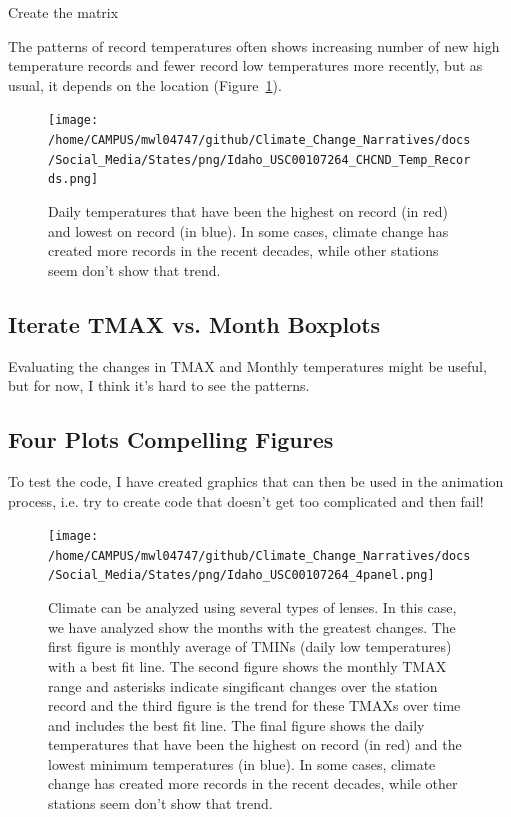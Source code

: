\documentclass{article}\usepackage[]{graphicx}\usepackage[]{color}
\makeatletter
\newenvironment{kframe}{%
 \def\at@end@of@kframe{}%
 \ifinner\ifhmode%
  \def\at@end@of@kframe{\end{minipage}}%
  \begin{minipage}{\columnwidth}%
 \fi\fi%
 \def\FrameCommand##1{\hskip\@totalleftmargin \hskip-\fboxsep
 \colorbox{shadecolor}{##1}\hskip-\fboxsep
     \hskip-\linewidth \hskip-\@totalleftmargin \hskip\columnwidth}%
 \MakeFramed {\advance\hsize-\width
   \@totalleftmargin\z@ \linewidth\hsize
   \@setminipage}}%
 {\par\unskip\endMakeFramed%
 \at@end@of@kframe}
\newenvironment{knitrout}{}{} %
\makeatother
\begin{document}
Create the matrix
\begin{knitrout}
\color{fgcolor}\begin{kframe}


{\ttfamily\noindent\bfseries\color{errorcolor}{\#\# Error in TMAX.mat.noleap[j, year.seq\$Col[year.seq\$Year == i]] <- CHCND.noleap\$TMAX[CHCND.noleap\$Year == : replacement has length zero}}\end{kframe}
\end{knitrout}




The patterns of record temperatures often shows increasing number of new high temperature records  and fewer record low temperatures more recently, but as usual, it depends on the location (Figure~\ref{fig:Records}).
\begin{figure}
\texttt{[image: /home/CAMPUS/mwl04747/github/Climate\_Change\_Narratives/docs/Social\_Media/States/png/Idaho\_USC00107264\_CHCND\_Temp\_Records.png]}
\caption{Daily temperatures that have been the highest on record (in red) and lowest on record (in blue). In some cases, climate change has created more records in the recent decades, while other stations seem don't show that trend.}
\label{fig:Records}
\end{figure}

\subsection{Iterate TMAX vs. Month Boxplots}

Evaluating the changes in TMAX and Monthly temperatures might be useful, but for now, I think it's hard to see the patterns. 




\subsection{Four Plots Compelling Figures}

To test the code, I have created graphics that can then be used in the animation process, i.e. try to create code that doesn't get too complicated and then fail! 



\begin{figure}
\texttt{[image: /home/CAMPUS/mwl04747/github/Climate\_Change\_Narratives/docs/Social\_Media/States/png/Idaho\_USC00107264\_4panel.png]}
\caption{Climate can be analyzed using several types of lenses. In this case, we have analyzed show the months with the greatest changes. The first figure is monthly average of TMINs (daily low temperatures) with a best fit line. The second figure shows the monthly TMAX range and asterisks indicate singificant changes over the station record and the third figure is the trend for these TMAXs over time and includes the best fit line. The final figure shows the daily temperatures that have been the highest on record (in red) and the lowest minimum temperatures (in blue). In some cases, climate change has created more records in the recent decades, while other stations seem don't show that trend.}
\label{fig:4panel}
\end{figure}
\end{document}
